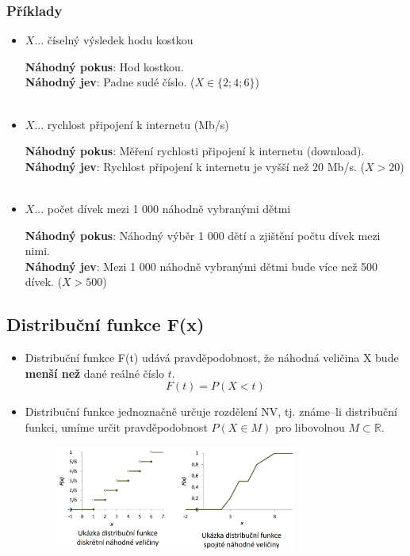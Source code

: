 \subsubsection*{Příklady}
\begin{itemize}
	\item[]	\begin{center}
		$X$... číselný výsledek hodu kostkou\\
		\end{center}
		\textbf{Náhodný pokus}: Hod kostkou. \\
		\textbf{Náhodný jev}: Padne sudé číslo. ($X \in \{2;4;6\}$) \\\\
		
	\item[]	\begin{center}
		$X$... rychlost připojení k internetu (Mb/s) \\
		\end{center}
		\textbf{Náhodný pokus}: Měření rychlosti připojení k internetu (download). \\
		\textbf{Náhodný jev}: Rychlost připojení k internetu je vyšší než 20 Mb/s.  ($X > 20$)\\\\
		
	\item[]	\begin{center}
		$X$... počet dívek mezi 1 000 náhodně vybranými dětmi \\
		\end{center}
		\textbf{Náhodný pokus}: Náhodný výběr 1 000 dětí a zjištění počtu dívek mezi nimi. \\
		\textbf{Náhodný jev}: Mezi 1 000 náhodně vybranými dětmi bude více než 500 dívek. ($X > 500$)
\end{itemize}





\subsection{Distribuční funkce F(x)}
\begin{itemize}
	\item Distribuční funkce F(t) udává pravděpodobnost, že náhodná veličina X bude \textbf{menší než} dané reálné číslo $t$. 
	$$F(t) = P(X <t)$$
	\item Distribuční funkce jednoznačně určuje rozdělení NV, tj. známe--li distribuční funkci, umíme určit pravděpodobnost $P(X \in M)$ pro libovolnou $M\subset \mathbb{R}$.
	\begin{figure}[H]
	\centering
	\includegraphics[width=0.75\textwidth]{assets/11_dist_fce}
	\end{figure}
\end{itemize}

